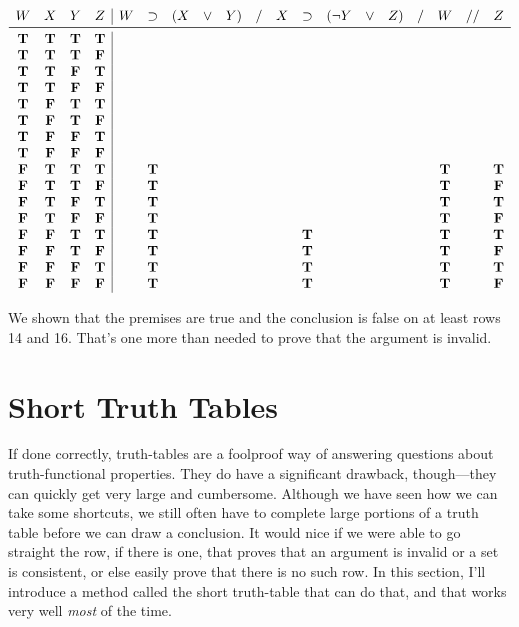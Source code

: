 \documentclass[../logic-text.tex]{subfiles}
\begin{document}
\[
  \begin{array}{cccc|cccccccccccccccc}
    W & X & Y & Z & W & \lif & (X & \lor&  Y)&  /&  X&  \lif&  (\lneg Y &  \lor &  Z) & / & W & // & Z \\ \midrule
    \true & \true & \true & \true &&&&&&&&&&&&&&& \\
    \true & \true & \true & \false &&&&&&&&&&&&&&& \\
    \true & \true & \false & \true &&&&&&&&&&&&&&& \\
    \true & \true & \false & \false &&&&&&&&&&&&&&& \\
    \true & \false & \true & \true &&&&&&&&&&&&&&& \\
    \true & \false & \true & \false &&&&&&&&&&&&&&& \\
    \true & \false & \false & \true &&&&&&&&&&&&&&& \\
    \true & \false & \false & \false &&&&&&&&&&&&&&& \\
    \false & \true & \true & \true && \true &&&&&&&&&&& \true && \true \\
    \false & \true & \true & \false && \true &&&&&&&&&&& \true && \false \\
    \false & \true & \false & \true && \true &&&&&&&&&&& \true && \true \\
    \false & \true & \false & \false && \true &&&&&&&&&&& \true && \false \\
    \false & \false & \true & \true && \true &&&&&& \true &&&&& \true && \true \\
    \false & \false & \true & \false && \true &&&&&& \true &&&&& \true && \false \\
    \false & \false & \false & \true && \true &&&&&& \true &&&&& \true && \true \\
    \false & \false & \false & \false && \true &&&&&& \true &&&&& \true && \false \\
\end{array}
\]


We shown that the premises are true and the conclusion is false on at least rows 14 and 16. That's one more than needed to prove that the argument is invalid.


\section{Short Truth Tables}
\label{sec:short-truth-tables}


If done correctly, truth-tables are a foolproof way of answering questions about truth-functional properties. They do have a significant drawback, though---they can quickly get very large and cumbersome. Although we have seen how we can take some shortcuts, we still often have to complete large portions of a truth table before we can draw a conclusion. It would nice if we were able to go straight the row, if there is one, that proves that an argument is invalid or a set is consistent, or else easily prove that there is no such row. In this section, I'll introduce a method called the short truth-table that can do that, and that works very well \emph{most} of the time.
\end{document}
